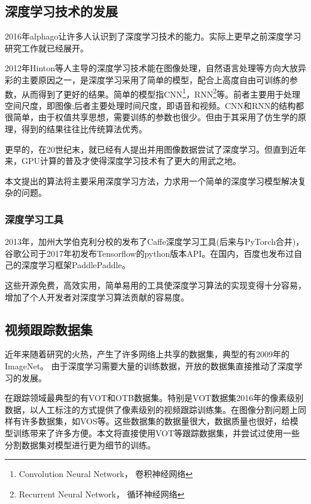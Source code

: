 \subsection{深度学习技术的发展}
2016年alphago\supercite{wang2016does}让许多人认识到了深度学习技术的能力。实际上更早之前深度学习研究工作就已经展开。
\par
2012年Hinton等人主导的深度学习技术能在图像处理，自然语言处理等方向大放异彩的主要原因之一，是深度学习采用了简单的模型，配合上高度自由可训练的参数，从而得到了更好的结果。简单的模型指CNN\footnote{Convolution Neural Network， 卷积神经网络}，RNN\footnote{Recurrent Neural Network， 循环神经网络}等。前者主要用于处理空间尺度，即图像;后者主要处理时间尺度，即语音和视频。CNN和RNN的结构都很简单，由于权值共享思想，需要训练的参数也很少。但由于其采用了仿生学的原理，得到的结果往往比传统算法优秀。
\par
更早的，在20世纪末，就已经有人提出并用图像数据尝试了深度学习\supercite{lecun1998gradient}。但直到近年来，GPU计算的普及才使得深度学习技术有了更大的用武之地。
\par
本文提出的算法将主要采用深度学习方法，力求用一个简单的深度学习模型解决复杂的问题。

\subsubsection{深度学习工具}
2013年，加州大学伯克利分校的发布了Caffe\supercite{jia2014caffe}深度学习工具(后来与PyTorch\supercite{paszke2017automatic}合并)，谷歌公司于2017年初发布Tensorflow\supercite{abadi2016tensorflow}的python版本API。在国内，百度也发布过自己的深度学习框架PaddlePaddle\supercite{recognize_digits_paddle}。
\par
这些开源免费，高效实用，简单易用的工具使深度学习算法的实现变得十分容易，增加了个人开发者对深度学习算法贡献的容易度。

\subsection{视频跟踪数据集}
近年来随着研究的火热，产生了许多网络上共享的数据集，典型的有2009年的ImageNet\supercite{imagenet_cvpr09}。
由于深度学习需要大量的训练数据，开放的数据集直接推动了深度学习的发展。
\par
在跟踪领域最典型的有VOT\supercite{VOT_TPAMI}和OTB\supercite{WuLimYang13}数据集。特别是VOT数据集2016年的像素级别数据\supercite{Vojir-TR-2017-01}，以人工标注的方式提供了像素级别的视频跟踪训练集。在图像分割问题上同样有许多数据集，如VOS\supercite{Cae+17}等。这些数据集的数据量很大，数据质量也很好，给模型训练带来了许多方便。本文将直接使用VOT等跟踪数据集，并尝试过使用一些分割数据集对模型进行更为细节的训练。

